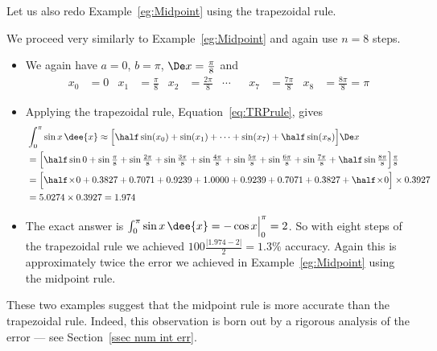 Let us also redo Example~\ref{eg:Midpoint} using the trapezoidal rule.
\begin{eg}\label{eg:Trap}
\soln We proceed very similarly to Example~\ref{eg:Midpoint} and again use $n=8$ steps.
\begin{itemize}
 \item We again have $a=0$, $b=\pi$, $\De x=\tfrac{\pi}{8}$ and
\begin{align*}
x_0&=0& x_1&=\tfrac{\pi}{8}&
x_2&=\tfrac{2\pi}{8}& \cdots&&
x_7&=\tfrac{7\pi}{8}&
x_8&=\tfrac{8\pi}{8}=\pi
\end{align*}
\item Applying the trapezoidal rule, Equation~\eqref{eq:TRPrule}, gives
\begin{align*}
&\int_0^\pi\sin x\,\dee{x}
\approx
\Big[\half\sin(x_0)+\sin(x_1)+\cdots+\sin(x_7)+\half\sin(x_8)\Big]\De x \\
&=\Big[\half\sin0 +
             \sin\tfrac{\pi}{8}+
             \sin\tfrac{2\pi}{8}+
             \sin\tfrac{3\pi}{8}+
             \sin\tfrac{4\pi}{8}+
             \sin\tfrac{5\pi}{8}+
             \sin\tfrac{6\pi}{8}+
             \sin\tfrac{7\pi}{8}+
        \half\sin\tfrac{8\pi}{8}\Big]\tfrac{\pi}{8}\\
&=\Big[\half\!\times\! 0+
             0.3827+
             0.7071+
             0.9239+
             1.0000+
             0.9239+
             0.7071+
             0.3827+
        \half\!\times\! 0\Big]\times 0.3927\\
&=5.0274\times 0.3927
=1.974
\end{align*}
\item The exact answer is $\int_0^\pi\sin x\,\dee{x}=-\cos x\Big|_0^\pi=2$. So with
eight steps  of the trapezoidal rule we  achieved $100\tfrac{|1.974-2|}{2}=1.3\%$
accuracy. Again this is approximately twice the error we achieved in
Example~\ref{eg:Midpoint} using the midpoint rule.
\end{itemize}
\end{eg}

These two examples suggest that the midpoint rule is more accurate than the
trapezoidal rule. Indeed, this observation is born out by a rigorous analysis of
the error --- see Section~\ref{ssec num int err}.

